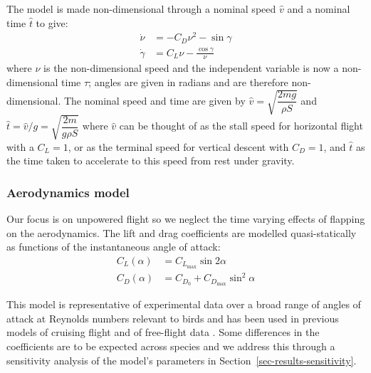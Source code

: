The model is made non-dimensional through a nominal speed $\hat{v}$ and a nominal time $\hat{t}$ to give:
\begin{equation}
    \begin{aligned}
        \dot{\nu}    & = -C_D \nu^2 - \sin\gamma          \\
        \dot{\gamma} & = C_L \nu - \frac{\cos\gamma}{\nu}
    \end{aligned}
    \label{eq-eom-nondim}
\end{equation}
where $\nu$ is the non-dimensional speed and the independent variable is now a non-dimensional time $\tau$; angles are given in radians and are therefore non-dimensional. The nominal speed and time are given by $\hat{v} = \sqrt{\dfrac{2mg}{\rho S}}$ and $\hat{t} = \hat{v}/g = \sqrt{\dfrac{2m}{g\rho S}}$ where $\hat{v}$ can be thought of as the stall speed for horizontal flight with a $C_L = 1$, or as the terminal speed for vertical descent with $C_D = 1$, and $\hat{t}$ as the time taken to accelerate to this speed from rest under gravity.

\subsubsection{Aerodynamics model}\label{sec-methods-aerodynamics}

Our focus is on unpowered flight so we neglect the time varying effects of flapping on the aerodynamics. The lift and drag coefficients are modelled quasi-statically as functions of the instantaneous angle of attack:
\begin{equation}
    \begin{aligned}
        C_L(\alpha) & = C_{L_{\max}} \sin 2\alpha           \\
        C_D(\alpha) & = C_{D_0} + C_{D_{\max}} \sin^2\alpha
    \end{aligned}
    \label{eq-clcd}
\end{equation}

This model is representative of experimental data over a broad range of angles of attack at Reynolds numbers relevant to birds \cite{usherwoodAerodynamicsRevolvingWings2002a,leishmanPrinciplesHelicopterAerodynamics2017,nabawyRoleLeadingEdge2017} and has been used in previous models of cruising flight \cite{parslewSimulatingAvianWingbeat2010} and of free-flight data \cite{mooreRobustPoststallPerching2014}. Some differences in the coefficients are to be expected across species \cite{leesInfluenceFlightStyle2016} and we address this through a sensitivity analysis of the model's parameters in Section~\ref{sec-results-sensitivity}.

